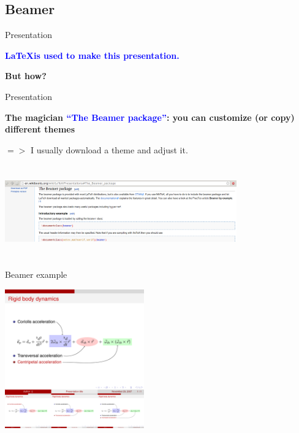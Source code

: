 \documentclass[]{beamer}
\begin{document}
\subsection{Beamer}
\begin{frame}[fragile]{Presentation}



\centering
\bf{\textcolor{blue}{\LaTeX is used to make this presentation.}}

\vspace{1cm}
\centering
\bf{But how?}


\end{frame}
\begin{frame}[fragile]{Presentation}

\bf{The magician \textcolor{blue}{``The Beamer package''}: you can customize (or copy) different themes}

$=>$ I usually download a theme and adjust it.

\vspace{0.8cm}
\centering
\includegraphics[width = 10cm, height = 4cm]{websiteBeamer.png}

\end{frame}
\begin{frame}{Beamer example}


\centering
\includegraphics[width = 6cm, height = 6cm]{beamer1}
\end{frame}
\end{document}
